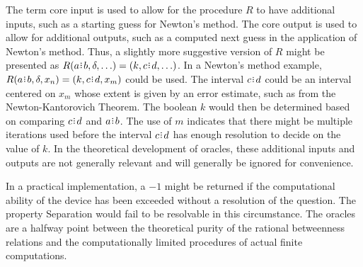 \documentclass[12pt]{article}
\begin{document}
The term core input is used to allow for the procedure $R$ to have additional inputs, such as a starting guess for Newton's method. The core output is used to allow for additional outputs, such as a computed next guess in the application of Newton's method. Thus, a slightly more suggestive version of $R$ might be presented as $R(a \rint b, \delta, \ldots) = (k, c \rint d, \ldots)$. In a Newton's method example, $R(a \rint b, \delta, x_n) = (k, c \rint d, x_m)$ could be used. The interval $c \rint d$ could be an interval centered on $x_m$ whose extent is given by an error estimate, such as from the Newton-Kantorovich Theorem. The boolean $k$ would then be determined based on comparing $c \rint d$ and $a \rint b$. The use of $m$ indicates that there might be multiple iterations used before the interval $c \rint d$ has enough resolution to decide on the value of $k$. In the theoretical development of oracles, these additional inputs and outputs are not generally relevant and will generally be ignored for convenience.  

In a practical implementation, a $-1$ might be returned if the computational ability of the device has been exceeded without a resolution of the question. The property Separation would fail to be resolvable in this circumstance. The oracles are a halfway point between the theoretical purity of the rational betweenness relations and the computationally limited procedures of actual finite computations. 
\end{document}
